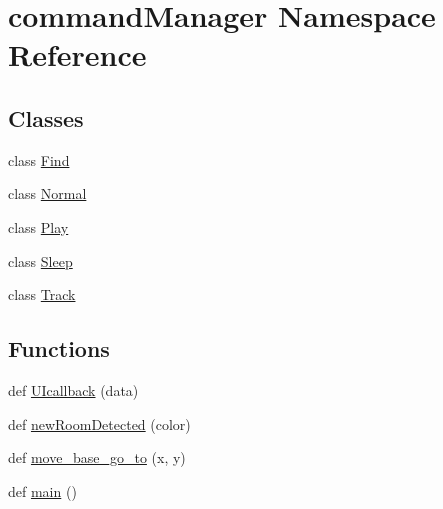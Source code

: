 \hypertarget{namespacecommandManager}{}\section{command\+Manager Namespace Reference}
\label{namespacecommandManager}
\subsection*{Classes}
\begin{DoxyCompactItemize}
\item 
class \hyperlink{classcommandManager_1_1Find}{Find}
\item 
class \hyperlink{classcommandManager_1_1Normal}{Normal}
\item 
class \hyperlink{classcommandManager_1_1Play}{Play}
\item 
class \hyperlink{classcommandManager_1_1Sleep}{Sleep}
\item 
class \hyperlink{classcommandManager_1_1Track}{Track}
\end{DoxyCompactItemize}
\subsection*{Functions}
\begin{DoxyCompactItemize}
\item 
def \hyperlink{namespacecommandManager_a2310383d56755f0a09a75b1a92130e21}{U\+Icallback} (data)
\item 
def \hyperlink{namespacecommandManager_aa96fd2ed94c8c1168e09ced4015dcb1b}{new\+Room\+Detected} (color)
\item 
def \hyperlink{namespacecommandManager_af8e54858c65310eb1e131529bf200516}{move\+\_\+base\+\_\+go\+\_\+to} (x, y)
\item 
def \hyperlink{namespacecommandManager_ae8b570eb4bf393859bc74c9cb5fe125f}{main} ()
\end{DoxyCompactItemize}
